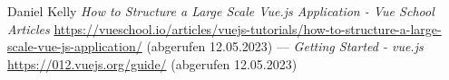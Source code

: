 \begin{thebibliography}{99}
	Daniel Kelly
	\emph{How to Structure a Large Scale Vue.js Application - Vue School Articles}
	\url{https://vueschool.io/articles/vuejs-tutorials/how-to-structure-a-large-scale-vue-js-application/}
	(abgerufen 12.05.2023)
	---
	\emph{Getting Started - vue.js}
	\url{https://012.vuejs.org/guide/}
	(abgerufen 12.05.2023)


\end{thebibliography}

